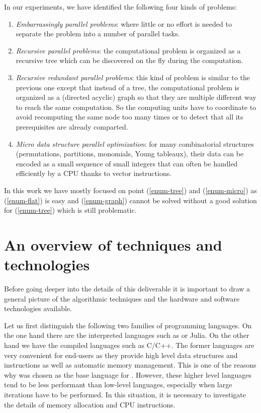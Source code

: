 \documentclass{deliverablereport}
\begin{document}
In our experiments, we have identified the following four kinds of problems:
\begin{enumerate}
\item\label{enum-flat} \emph{Embarrassingly parallel problems}: where
  little or no effort is needed to separate the problem into a number of
  parallel tasks.
\item\label{enum-tree} \emph{Recursive parallel problems}: the computational
  problem is organized as a recursive tree which can be discovered on the fly
  during the computation.
\item\label{enum-graph} \emph{Recursive redundant parallel problems}: this
  kind of problem is similar to the previous one except that instead of a
  tree, the computational problem is organized as a (directed acyclic) graph
  so that they are multiple different way to reach the same computation. So the
  computing units have to coordinate to avoid recomputing the same node too
  many times or to detect that all its prerequisites are already comparted.
\item\label{enum-micro} \emph{Micro data structure parallel optimization}:
  for many combinatorial structures (permutations, partitions, monomials, Young
  tableaux), their data can be encoded as a small sequence of small integers
  that can often be handled efficiently by a CPU thanks to vector instructions.
\end{enumerate}
In this work we have mostly focused on point (\ref{enum-tree}) and
(\ref{enum-micro}) as (\ref{enum-flat}) is easy and (\ref{enum-graph}) cannot
be solved without a good solution for (\ref{enum-tree}) which is still
problematic.


\section{An overview of techniques and technologies}

Before going deeper into the details of this deliverable it is important to
draw a general picture of the algorithmic techniques and the hardware and
software technologies available.

Let us first distinguish the following two families of programming
languages. On the one hand there are the interpreted languages
such as \Python or Julia. On the other hand we have the compiled languages
such as C/C++. The former languages are very convenient for end-users as
they provide high level data structures and instructions as well as automatic
memory management. This is one of the reasons why \Python was chosen as the
base language for \Sage. However, these higher level languages tend to be less
performant than low-level languages, especially when large
iterations have to be performed. In this situation, it is necessary to
investigate the details of memory allocation and CPU instructions. 
\end{document}
